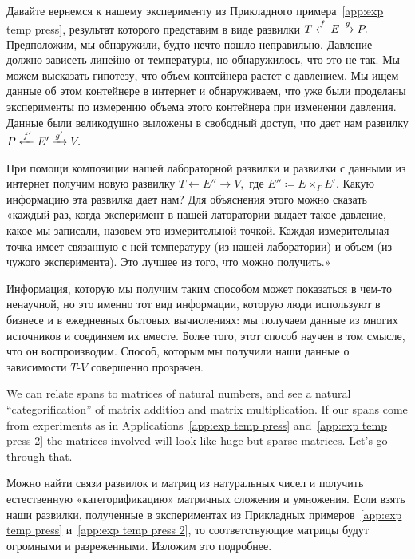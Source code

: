 \documentclass[../main/CT4S-EN-RU]{subfiles}
\begin{document}
\begin{applicationRUS}\label{app:exp temp press 2}
Давайте вернемся к нашему эксперименту из Прикладного примера~\ref{app:exp temp press}, результат которого представим в виде развилки $T\xleftarrow{f}E\xrightarrow{g}P.$ Предположим, мы обнаружили, будто нечто пошло неправильно. Давление должно зависеть линейно от температуры, но обнаружилось, что это не так. Мы можем высказать гипотезу, что объем контейнера растет с давлением. Мы ищем данные об этом контейнере в интернет и обнаруживаем, что уже были проделаны эксперименты по измерению объема этого контейнера при изменении давления. Данные были великодушно выложены в свободный доступ, что дает нам развилку $P\xleftarrow{f'}E'\xrightarrow{g'}V.$ 

При помощи композиции нашей лабораторной развилки и развилки с данными из интернет получим новую развилку $T{←} E''{→} V,$ где $E''{\coloneqq}E\times_PE'.$ Какую информацию эта развилка дает нам? Для объяснения этого можно сказать «каждый раз, когда эксперимент в нашей латоратории выдает такое давление, какое мы записали, назовем это измерительной точкой. Каждая измерительная точка имеет связанную с ней температуру (из нашей лаборатории) и объем (из чужого эксперимента). Это лучшее из того, что можно получить.»

Информация, которую мы получим таким способом может показаться в чем-то ненаучной, но это именно тот вид информации, которую люди используют в бизнесе и в ежедневных бытовых вычислениях: мы получаем данные из многих источников и соединяем их вместе. Более того, этот способ научен в том смысле, что он воспроизводим. Способ, которым мы получили наши данные о зависимости $T$-$V$ совершенно прозрачен.
\end{applicationRUS}

\begin{blockENG}
We can relate spans to matrices of natural numbers, and see a natural “categorification” of matrix addition and matrix multiplication. If our spans come from experiments as in Applications~\ref{app:exp temp press} and~\ref{app:exp temp press 2} the matrices involved will look like huge but sparse matrices. Let's go through that.
\end{blockENG}

\begin{blockRUS}
Можно найти связи развилок и матриц из натуральных чисел и получить естественную «категорификацию» матричных сложения и умножения. Если взять наши развилки, полученные в экспериментах из Прикладных примеров~\ref{app:exp temp press} и~\ref{app:exp temp press 2}, то соответствующие матрицы будут огромными и разреженными. Изложим это подробнее.
\end{blockRUS}
\end{document}
